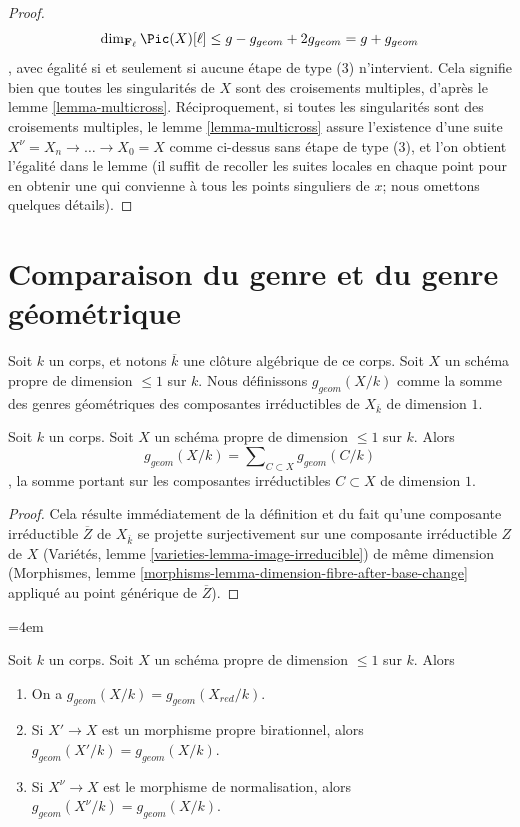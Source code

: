 \begin{proof}
$$\dim_{\mathbf{F}_\ell} \Pic(X)[\ell] \leq
g - g_{geom} + 2g_{geom} = g + g_{geom}
$$, avec égalité si et seulement si aucune étape de type (3) n'intervient. Cela signifie bien que toutes les singularités de $X$ sont des croisements multiples, d'après le lemme \ref{lemma-multicross}. Réciproquement, si toutes les singularités sont des croisements multiples, le lemme \ref{lemma-multicross} assure l'existence d'une suite $X^\nu = X_n \to \ldots \to X_0 = X$ comme ci-dessus sans étape de type (3), et l'on obtient l'égalité dans le lemme (il suffit de recoller les suites locales en chaque point pour en obtenir une qui convienne à tous les points singuliers de $x$; nous omettons quelques détails).
\end{proof}
\endgroup





\section{Comparaison du genre et du genre géométrique}
\label{section-genus-geometric-genus}

\noindent
Soit $k$ un corps, et notons $\overline{k}$ une clôture algébrique de ce corps. Soit $X$ un schéma propre de dimension $\leq 1$ sur $k$. Nous définissons $g_{geom}(X/k)$ comme la somme des genres géométriques des composantes irréductibles de $X_{\overline{k}}$ de dimension $1$.

\begin{lemma}
\label{lemma-bound-geometric-genus}
Soit $k$ un corps. Soit $X$ un schéma propre de dimension $\leq 1$ sur $k$. Alors $$
g_{geom}(X/k) = \sum\nolimits_{C \subset X} g_{geom}(C/k)
$$, la somme portant sur les composantes irréductibles $C \subset X$ de dimension $1$.
\end{lemma}

\begin{proof}
Cela résulte immédiatement de la définition et du fait qu'une composante irréductible $\overline{Z}$ de $X_{\overline{k}}$ se projette surjectivement sur une composante irréductible $Z$ de $X$ (Variétés, lemme \ref{varieties-lemma-image-irreducible}) de même dimension (Morphismes, lemme \ref{morphisms-lemma-dimension-fibre-after-base-change} appliqué au point générique de $\overline{Z}$).
\end{proof}

\begingroup\emergencystretch=4em
\begin{lemma}
\label{lemma-geometric-genus-normalization}
Soit $k$ un corps. Soit $X$ un schéma propre de dimension $\leq 1$ sur $k$. Alors \begin{enumerate} \item On a $g_{geom}(X/k) = g_{geom}(X_{red}/k)$. \item Si $X' \to X$ est un morphisme propre birationnel, alors $g_{geom}(X'/k) = g_{geom}(X/k)$. \item Si $X^\nu \to X$ est le morphisme de normalisation, alors $g_{geom}(X^\nu/k) = g_{geom}(X/k)$.
\end{enumerate}
\end{lemma}
\endgroup

